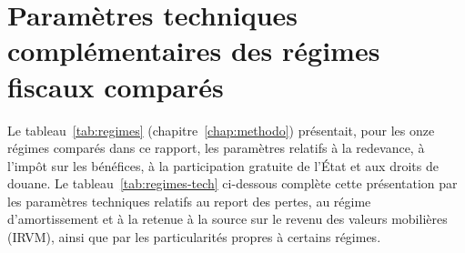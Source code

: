 \chapter{Paramètres techniques complémentaires des régimes fiscaux comparés}
\label{annexe:a}

Le tableau~\ref{tab:regimes} (chapitre~\ref{chap:methodo}) présentait, pour les onze régimes comparés dans ce rapport, les paramètres relatifs à la redevance, à l'impôt sur les bénéfices, à la participation gratuite de l'État et aux droits de douane. Le tableau~\ref{tab:regimes-tech} ci-dessous complète cette présentation par les paramètres techniques relatifs au report des pertes, au régime d'amortissement et à la retenue à la source sur le revenu des valeurs mobilières (IRVM), ainsi que par les particularités propres à certains régimes.

